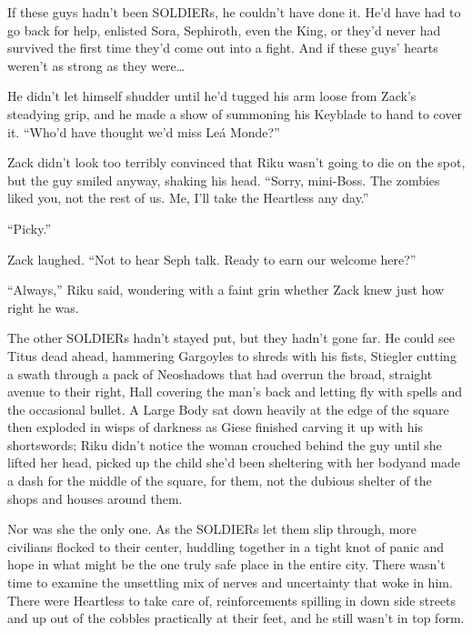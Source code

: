 If these guys hadn't been SOLDIERs, he couldn't have done it. He'd have had to go back for help, enlisted Sora, Sephiroth, even the King, or they'd never had survived the first time they'd come out into a fight. And if these guys' hearts weren't as strong as they were\ldots 

He didn't let himself shudder until he'd tugged his arm loose from Zack's steadying grip, and he made a show of summoning his Keyblade to hand to cover it. ``Who'd have thought we'd miss Leá Monde?''

Zack didn't look too terribly convinced that Riku wasn't going to die on the spot, but the guy smiled anyway, shaking his head. ``Sorry, mini-Boss. The zombies liked you, not the rest of us. Me, I'll take the Heartless any day.''

``Picky.''

Zack laughed. ``Not to hear Seph talk. Ready to earn our welcome here?''

``Always,'' Riku said, wondering with a faint grin whether Zack knew just how right he was.
\begin{sloppypar}
The other SOLDIERs hadn't stayed put, but they hadn't gone far. He could see Titus dead ahead, hammering Gargoyles to shreds with his fists, Stiegler cutting a swath through a pack of Neoshadows that had overrun the broad, straight avenue to their right, Hall covering the man's back and letting fly with spells and the occasional bullet. A Large Body sat down heavily at the edge of the square then exploded in wisps of darkness as Giese finished carving it up with his shortswords; Riku didn't notice the woman crouched behind the guy until she lifted her head, picked up the child she'd been sheltering with her body\textemdash and made a dash for the middle of the square, for them, not the dubious shelter of the shops and houses around them.
\end{sloppypar}
Nor was she the only one. As the SOLDIERs let them slip through, more civilians flocked to their center, huddling together in a tight knot of panic and hope in what might be the one truly safe place in the entire city. There wasn't time to examine the unsettling mix of nerves and uncertainty that woke in him. There were Heartless to take care of, reinforcements spilling in down side streets and up out of the cobbles practically at their feet, and he still wasn't in top form.

